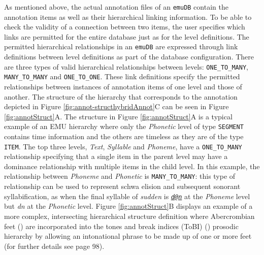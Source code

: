 \documentclass[]{book}
\begin{document}
As mentioned above, the actual annotation files of an \texttt{emuDB} contain the annotation items as well as their hierarchical linking information. To be able to check the validity of a connection between two items, the user specifies which links are permitted for the entire database just as for the level definitions. The permitted hierarchical relationships in an \texttt{emuDB} are expressed through link definitions between level definitions as part of the database configuration. There are three types of valid hierarchical relationships between levels: \texttt{ONE\_TO\_MANY}, \texttt{MANY\_TO\_MANY} and \texttt{ONE\_TO\_ONE}. These link definitions specify the permitted relationships between instances of annotation items of one level and those of another. The structure of the hierarchy that corresponds to the annotation depicted in Figure \ref{fig:annot-structhybridAnnot}C can be seen in Figure \ref{fig:annotStruct}A. The structure in Figure \ref{fig:annotStruct}A is a typical example of an EMU hierarchy where only the \textit{Phonetic} level of type \texttt{SEGMENT} contains time information and the others are timeless as they are of the type \texttt{ITEM}. The top three levels, \emph{Text}, \emph{Syllable} and \emph{Phoneme}, have a \texttt{ONE\_TO\_MANY} relationship specifying that a single item in the parent level may have a dominance relationship with multiple items in the child level. In this example, the relationship between \textit{Phoneme} and \emph{Phonetic} is \texttt{MANY\_TO\_MANY}: this type of relationship can be used to represent schwa elision and subsequent sonorant syllabification, as when the final syllable of \emph{sudden} is \emph{\href{mailto:d@n}{\nolinkurl{d@n}}} at the \emph{Phoneme} level but \emph{dn} at the \emph{Phonetic} level. Figure \ref{fig:annotStruct}B displays an example of a more complex, intersecting hierarchical structure definition where Abercrombian feet (\citet{abercombie:1967a}) are incorporated into the tones and break indices (ToBI) (\citet{beckman:1997aa}) prosodic hierarchy by allowing an intonational phrase to be made up of one or more feet (for further details see \citet{harrington:2010a} page 98).
\end{document}
